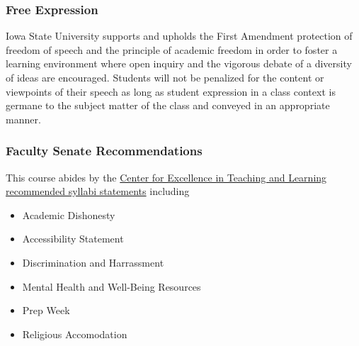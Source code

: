 \documentclass[12pt]{article}
\begin{document}
\subsubsection*{Free Expression}

Iowa State University supports and upholds the First Amendment protection of freedom of speech and the principle of academic freedom in order to foster a learning environment where open inquiry and the vigorous debate of a diversity of ideas are encouraged. Students will not be penalized for the content or viewpoints of their speech as long as student expression in a class context is germane to the subject matter of the class and conveyed in an appropriate manner.


\subsubsection*{Faculty Senate Recommendations}

This course abides by the
\href{https://www.celt.iastate.edu/instructional-strategies/preparing-to-teach/how-to-create-an-effective-syllabus/recommended-iowa-state-university-syllabus-statements/}{Center for Excellence in Teaching and Learning recommended syllabi statements}
including
\begin{itemize}
\item Academic Dishonesty
\item Accessibility Statement
\item Discrimination and Harrassment
\item Mental Health and Well-Being Resources
\item Prep Week
\item Religious Accomodation
\end{itemize}
\end{document}
